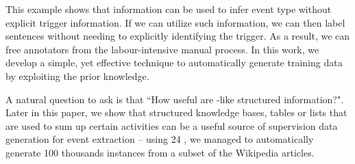 This example shows that \CVT information can be used to infer event type without explicit trigger information. If we can utilize such \CVT
information, we can then label sentences without needing to explicitly identifying the trigger. As a result, we can free annotators from
the labour-intensive manual process. In this work, we develop a simple, yet effective technique to automatically generate training data by
exploiting the prior \CVT knowledge.

A natural question to ask is that ``How useful are \CVT-like structured information?". Later in this paper, we show that structured
knowledge bases, tables or lists that are used to sum up certain activities can be a useful source of supervision data generation for event
extraction -- using 24 \CVTs, we managed to automatically generate 100 thousands instances from a subset of the Wikipedia articles.

%


